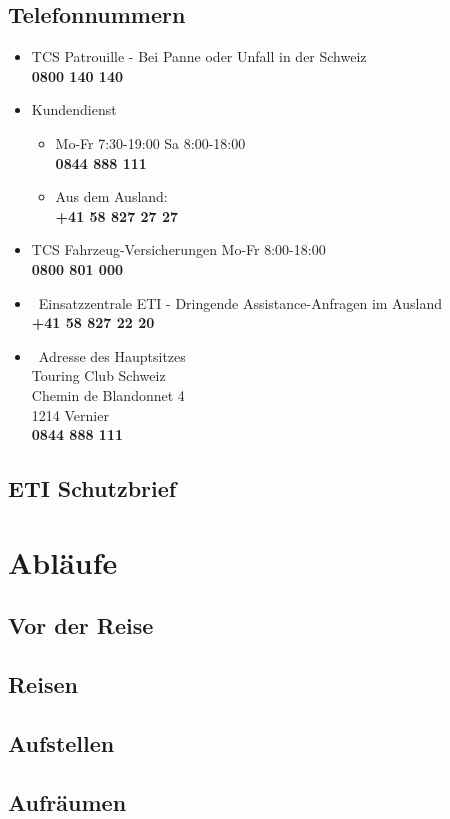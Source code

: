 \subsection{Telefonnummern}
\begin{itemize}
    \item TCS Patrouille - Bei Panne oder Unfall in der Schweiz \\ \textbf{0800 140 140}
     \item Kundendienst 
\begin{itemize}
    \item Mo-Fr 7:30-19:00 Sa 8:00-18:00 \\ \textbf{0844 888 111}
    \item Aus dem Ausland: \\ \textbf{+41 58 827 27 27}
\end{itemize} 
\item TCS Fahrzeug-Versicherungen Mo-Fr 8:00-18:00 \\ \textbf{0800 801 000}
\item\ Einsatzzentrale ETI - Dringende Assistance-Anfragen im Ausland \\ \textbf{+41 58 827 22 20}
\item\ Adresse des Hauptsitzes \\
Touring Club Schweiz \\
Chemin de Blandonnet 4 \\
1214 Vernier \\
\textbf{0844 888 111}
\end{itemize} 

\subsection{ETI Schutzbrief}
\newpage
\section{Abläufe}
\subsection{Vor der Reise}
\subsection{Reisen}
\subsection{Aufstellen}
\subsection{Aufräumen}
